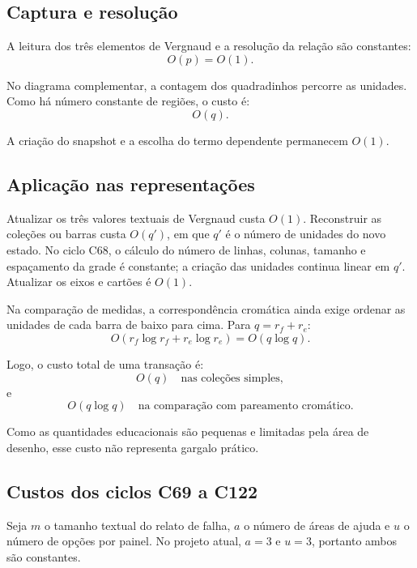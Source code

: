 \documentclass[12pt,a4paper]{article}
\begin{document}
\subsection{Captura e resolução}

A leitura dos três elementos de Vergnaud e a resolução da relação são constantes:
\[
O(p)=O(1).
\]

No diagrama complementar, a contagem dos quadradinhos percorre as unidades. Como há número constante de regiões, o custo é:
\[
O(q).
\]

A criação do snapshot e a escolha do termo dependente permanecem $O(1)$.

\subsection{Aplicação nas representações}

Atualizar os três valores textuais de Vergnaud custa $O(1)$. Reconstruir as coleções ou barras custa $O(q')$, em que $q'$ é o número de unidades do novo estado. No ciclo C68, o cálculo do número de linhas, colunas, tamanho e espaçamento da grade é constante; a criação das unidades continua linear em $q'$. Atualizar os eixos e cartões é $O(1)$.

Na comparação de medidas, a correspondência cromática ainda exige ordenar as unidades de cada barra de baixo para cima. Para $q=r_f+r_e$:
\[
O(r_f\log r_f+r_e\log r_e)=O(q\log q).
\]

Logo, o custo total de uma transação é:
\[
O(q) \quad \text{nas coleções simples},
\]
e
\[
O(q\log q) \quad \text{na comparação com pareamento cromático}.
\]

Como as quantidades educacionais são pequenas e limitadas pela área de desenho, esse custo não representa gargalo prático.

\subsection{Custos dos ciclos C69 a C122}
Seja $m$ o tamanho textual do relato de falha, $a$ o número de áreas de ajuda e $u$ o número de opções por painel. No projeto atual, $a=3$ e $u=3$, portanto ambos são constantes.
\end{document}
